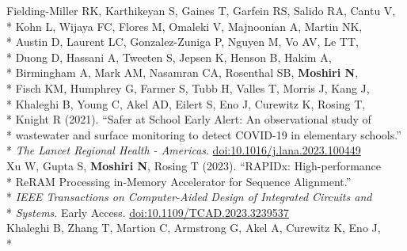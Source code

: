 \documentclass[margin,line]{res}
\begin{document}
\begin{resume}
\hspace*{4mm} Fielding-Miller RK, Karthikeyan S, Gaines T, Garfein RS, Salido RA, Cantu V,\\*
\hspace*{9mm} Kohn L, Wijaya FC, Flores M, Omaleki V, Majnoonian A, Martin NK,\\*
\hspace*{9mm} Austin D, Laurent LC, Gonzalez-Zuniga P, Nguyen M, Vo AV, Le TT,\\*
\hspace*{9mm} Duong D, Hassani A, Tweeten S, Jepsen K, Henson B, Hakim A,\\*
\hspace*{9mm} Birmingham A, Mark AM, Nasamran CA, Rosenthal SB, \textbf{Moshiri N},\\*
\hspace*{9mm} Fisch KM, Humphrey G, Farmer S, Tubb H, Valles T, Morris J, Kang J,\\*
\hspace*{9mm} Khaleghi B, Young C, Akel AD, Eilert S, Eno J, Curewitz K, Rosing T,\\*
\hspace*{9mm} Knight R (2021). ``Safer at School Early Alert: An observational study of\\*
\hspace*{9mm} wastewater and surface monitoring to detect COVID-19 in elementary schools.''\\*\vspace{2mm}
\hspace*{7mm} \textit{The Lancet Regional Health - Americas}. \href{https://doi.org/10.1016/j.lana.2023.100449}{doi:10.1016/j.lana.2023.100449}\\
\hspace*{4mm} Xu W, Gupta S, \textbf{Moshiri N}, Rosing T (2023). ``RAPIDx: High-performance\\*
\hspace*{9mm} ReRAM Processing in-Memory Accelerator for Sequence Alignment.''\\*
\hspace*{9mm} \textit{IEEE Transactions on Computer-Aided Design of Integrated Circuits and}\\*\vspace{2mm}
\hspace*{8mm} \textit{Systems}. Early Access. \href{https://doi.org/10.1109/TCAD.2023.3239537}{doi:10.1109/TCAD.2023.3239537}\\
\hspace*{4mm} Khaleghi B, Zhang T, Martion C, Armstrong G, Akel A, Curewitz K, Eno J,\\*

\end{resume}
\end{document}

